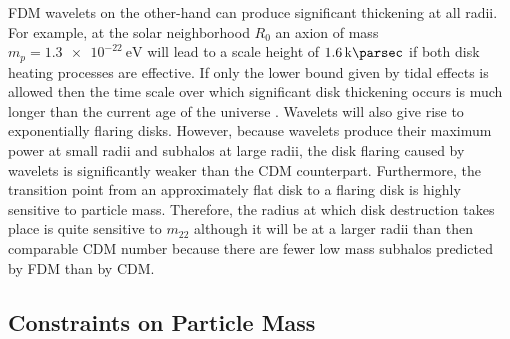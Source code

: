 \documentclass[usenatbib]{mnras}
\begin{document}
\par
FDM wavelets on the other-hand can produce significant thickening at all radii. For example, at the solar neighborhood $R_0$ an axion of mass $m_p = \SI{1.3 e-22}{\electronvolt}$ will lead to a scale height of $\SI{1.6}{ \kilo\parsec}$ if both disk heating processes are effective. If only the lower bound given by tidal effects is allowed then the time scale over which significant disk thickening occurs is much longer than the current age of the universe \citep{ultralight}. Wavelets will also give rise to exponentially flaring disks. However, because wavelets produce their maximum power at small radii and subhalos at large radii, the disk flaring caused by wavelets is significantly weaker than the CDM counterpart. Furthermore, the transition point from an approximately flat disk to a flaring disk is highly sensitive to particle mass. Therefore, the radius at which disk destruction takes place is quite sensitive to $m_{22}$ although it will be at a larger radii than then comparable CDM number because there are fewer low mass subhalos predicted by FDM than by CDM. 


\subsection{Constraints on Particle Mass}
\end{document}
